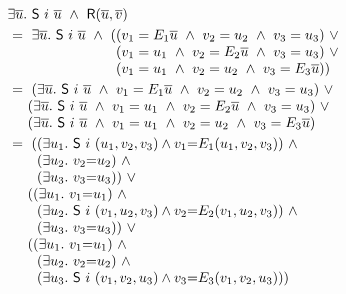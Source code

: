 \documentclass[12pt]{article}
\newcommand{\con}[1]{\mbox{\sf #1}}
\newcommand{\prev}[1]{#1}
\newcommand{\ma}[1]{{{$#1$}}}
\begin{document}
~~~\ma{\begin{array}{l}

\exists \overline{u}.
~{\con{S}~i~}\overline{u}~\wedge~
{{{\con R}(\overline{u},\overline{v})}}\\[1mm]

~=~\exists \overline{u}.
~{\con{S}~i~}\overline{u}~\wedge~
 ((v_1 = E_1\overline{u}  ~\wedge~ v_2 = \prev{u_2}            ~\wedge~ v_3 = \prev{u_3})~\vee\\
\phantom{~=~ \exists \overline{u}.
~{\con{S}~i~}\overline{u}~\wedge~(}
(v_1 = \prev{u_1}           ~\wedge~ v_2 = E_2\overline{u}   ~\wedge~ v_3 = \prev{u_3})~\vee\\
\phantom{~=~ \exists \overline{u}.
~{\con{S}~i~}\overline{u}~\wedge~(}
(v_1 = \prev{u_1}           ~\wedge~ v_2 = \prev{u_2}            ~\wedge~ v_3 = E_3\overline{u}))\\[1mm]

~=~(\exists \overline{u}.
~{\con{S}~i~}\overline{u}~\wedge~
v_1 = E_1\overline{u}  ~\wedge~ v_2 = \prev{u_2}            ~\wedge~ v_3 = \prev{u_3})~\vee\\
\phantom{~=~} (\exists \overline{u}.
~{\con{S}~i~}\overline{u}~\wedge~
v_1 = \prev{u_1}           ~\wedge~ v_2 = E_2\overline{u}   ~\wedge~ v_3 = \prev{u_3})~\vee\\
\phantom{~=~}(\exists \overline{u}.
~{\con{S}~i~}\overline{u}~\wedge~
v_1 = \prev{u_1}           ~\wedge~ v_2 = \prev{u_2}            ~\wedge~ v_3 = E_3\overline{u})\\[1mm]


~=~((\exists \prev{u_1}.~{\con{S}~i~}(\prev{u_1},{v_2},{v_3})\wedge
v_1{=}E_1(\prev{u_1},{v_2},{v_3}))~\wedge\\
\phantom{~=~(}(\exists\prev{u_2}.~v_2{=}\prev{u_2})
~\wedge\\
\phantom{~=~(}(\exists\prev{u_3}.~v_3{=}\prev{u_3}))~\vee\\
\phantom{~=~}
((\exists\prev{u_1}.~v_1{=}\prev{u_1})~\wedge\\
\phantom{~=~(}(\exists \prev{u_2}.~{\con{S}~i~}({v_1},\prev{u_2},{v_3})\wedge
v_2{=}E_2({v_1},\prev{u_2},{v_3}))~\wedge\\
\phantom{~=~(}(\exists\prev{u_3}.~v_3{=}\prev{u_3}))~\vee\\
\phantom{~=~}
((\exists\prev{u_1}.~v_1{=}\prev{u_1})~\wedge\\
\phantom{~=~(}
(\exists\prev{u_2}.~v_2{=}\prev{u_2})~\wedge\\
\phantom{~=~(}(\exists \prev{u_3}.~{\con{S}~i~}({v_1},{v_2},\prev{u_3})\wedge
v_3{=}E_3({v_1},{v_2},\prev{u_3})))\\[1mm]



\end{array}}
\end{document}
